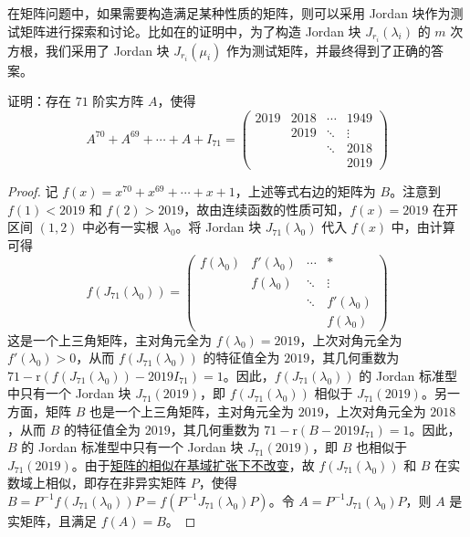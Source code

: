 \documentclass[../../main.tex]{subfiles}%
\begin{document}
在矩阵问题中，如果需要构造满足某种性质的矩阵，则可以采用 Jordan 块作为测试矩阵进行探索和讨论。比如在的证明中，为了构造 Jordan 块 $J_{r_i}(\lambda_i)$ 的 $m$ 次方根，我们采用了 Jordan 块 $J_{r_i}(\mu_i)$ 作为测试矩阵，并最终得到了正确的答案。

\begin{example}
证明：存在 $71$ 阶实方阵 $A$，使得
\[
A^{70}+A^{69}+\cdots+A + I_{71}=
\begin{pmatrix}
2019 & 2018 & \cdots & 1949 \\
& 2019 & \ddots & \vdots \\
& & \ddots & 2018 \\
& & & 2019
\end{pmatrix}
\]
\end{example}
\begin{proof}
记 $f(x) = x^{70}+x^{69}+\cdots+x + 1$，上述等式右边的矩阵为 $B$。注意到 $f(1) < 2019$ 和 $f(2) > 2019$，故由连续函数的性质可知，$f(x)=2019$ 在开区间 $(1,2)$ 中必有一实根 $\lambda_0$。将 Jordan 块 $J_{71}(\lambda_0)$ 代入 $f(x)$ 中，由计算可得
\[
f(J_{71}(\lambda_0))=
\begin{pmatrix}
f(\lambda_0) & f'(\lambda_0) & \cdots & * \\
& f(\lambda_0) & \ddots & \vdots \\
& & \ddots & f'(\lambda_0) \\
& & & f(\lambda_0)
\end{pmatrix}
\]
这是一个上三角矩阵，主对角元全为 $f(\lambda_0)=2019$，上次对角元全为 $f'(\lambda_0)>0$，从而 $f(J_{71}(\lambda_0))$ 的特征值全为 $2019$，其几何重数为 $71 - \mathrm{r}(f(J_{71}(\lambda_0)) - 2019I_{71}) = 1$。因此，$f(J_{71}(\lambda_0))$ 的 Jordan 标准型中只有一个 Jordan 块 $J_{71}(2019)$，即 $f(J_{71}(\lambda_0))$ 相似于 $J_{71}(2019)$。另一方面，矩阵 $B$ 也是一个上三角矩阵，主对角元全为 $2019$，上次对角元全为 $2018$，从而 $B$ 的特征值全为 $2019$，其几何重数为 $71 - \mathrm{r}(B - 2019I_{71}) = 1$。因此，$B$ 的 Jordan 标准型中只有一个 Jordan 块 $J_{71}(2019)$，即 $B$ 也相似于 $J_{71}(2019)$。由于\hyperref[corollary:矩阵的相似关系在基域扩张下不变]{矩阵的相似在基域扩张下不改变}，故 $f(J_{71}(\lambda_0))$ 和 $B$ 在实数域上相似，即存在非异实矩阵 $P$，使得 $B = P^{-1}f(J_{71}(\lambda_0))P = f(P^{-1}J_{71}(\lambda_0)P)$。令 $A = P^{-1}J_{71}(\lambda_0)P$，则 $A$ 是实矩阵，且满足 $f(A) = B$。
\end{proof}
\end{document}
